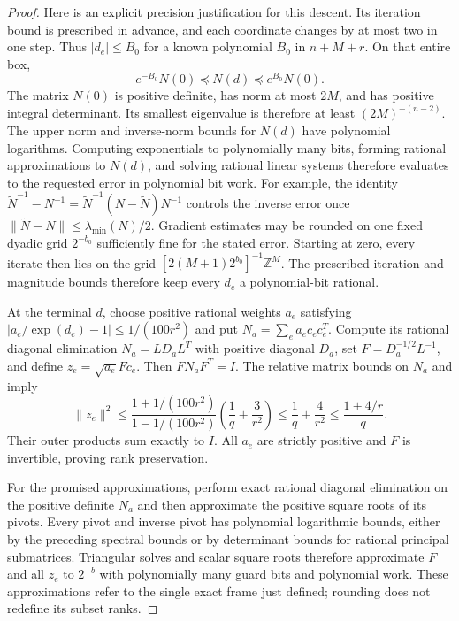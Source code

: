\begin{proof}
Here is an explicit precision justification for this descent. Its
iteration bound is prescribed in advance, and each coordinate changes
by at most two in one step. Thus $|d_e|\le B_0$ for a known polynomial
$B_0$ in $n+M+r$. On that entire box,
\[
 e^{-B_0}N(0)\preceq N(d)\preceq e^{B_0}N(0).
\]
The matrix $N(0)$ is positive definite, has norm at most $2M$, and has
positive integral determinant. Its smallest eigenvalue is therefore
at least $(2M)^{-(n-2)}$. The upper norm and inverse-norm bounds for
$N(d)$ have polynomial logarithms. Computing exponentials to
polynomially many bits, forming rational approximations to $N(d)$,
and solving rational linear systems therefore evaluates
 to the requested error in polynomial bit work.
For example, the identity
$\widetilde N^{-1}-N^{-1}=\widetilde N^{-1}(N-\widetilde N)N^{-1}$
controls the inverse error once
$\|\widetilde N-N\|\le\lambda_{\min}(N)/2$.
Gradient estimates may be rounded on one fixed dyadic grid $2^{-b_0}$
sufficiently fine for the stated error. Starting at zero, every iterate
then lies on the grid $[2(M+1)2^{b_0}]^{-1}\mathbb Z^M$.
The prescribed iteration and magnitude bounds therefore keep every
$d_e$ a polynomial-bit rational.

At the terminal $d$, choose positive rational weights $a_e$ satisfying
$|a_e/\exp(d_e)-1|\le1/(100r^2)$ and put
$N_a=\sum_e a_ec_ec_e^T$.
Compute its rational diagonal elimination $N_a=L D_aL^T$ with positive
diagonal $D_a$, set $F=D_a^{-1/2}L^{-1}$, and define
$z_e=\sqrt{a_e}Fc_e$. Then $FN_aF^T=I$. The relative matrix bounds on $N_a$ and
 imply
\[
 \|z_e\|^2
 \le\frac{1+1/(100r^2)}{1-1/(100r^2)}
                          \left(\frac1q+\frac3{r^2}\right)
 \le\frac1q+\frac4{r^2}\le\frac{1+4/r}{q}.
\]
Their outer products sum exactly to $I$. All $a_e$ are strictly positive
and $F$ is invertible, proving rank preservation.

For the promised approximations, perform exact rational diagonal
elimination on the positive definite $N_a$ and then approximate the
positive square roots of its pivots. Every pivot and inverse pivot
has polynomial logarithmic bounds, either by the preceding spectral
bounds or by determinant bounds for rational principal submatrices.
Triangular solves and scalar square roots therefore approximate $F$
and all $z_e$ to $2^{-b}$ with polynomially many guard bits and
polynomial work. These approximations refer to the single exact frame
just defined; rounding does not redefine its subset ranks.
\end{proof}
